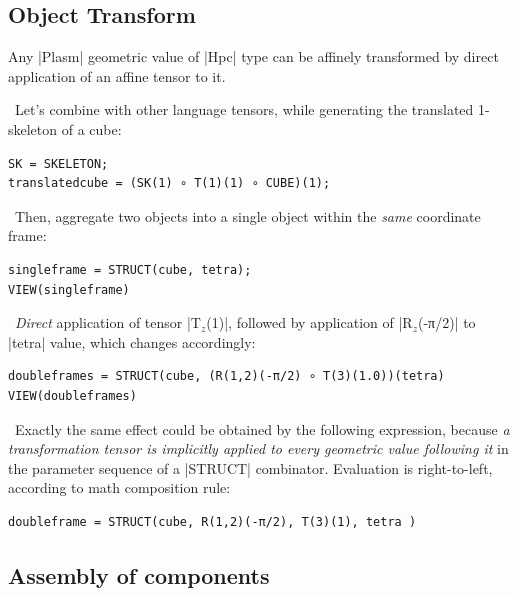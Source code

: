 \begin{coding}
\subsection*{Object Transform}\label{sect:4-3-1} Any |Plasm| geometric value of |Hpc| type can be affinely transformed by direct application of an affine tensor to it.

\begin{coding}\ 
Let’s combine with other language tensors, while generating the translated 1-skeleton of a cube:
\begin{lstlisting}[language=JuliaLocal, style=julia, mathescape=true]
SK = SKELETON;
translatedcube = (SK(1) ∘ T(1)(1) ∘ CUBE)(1);
\end{lstlisting}
\end{coding}

\begin{coding}[Example.2]\ 
Then, aggregate two objects into a single object within the \emph{same} coordinate frame:
\begin{lstlisting}[language=JuliaLocal, style=julia, mathescape=true]
singleframe = STRUCT(cube, tetra);
VIEW(singleframe)
\end{lstlisting}
\end{coding}

\begin{coding}[Example.3]\ 
\emph{Direct} application of tensor |T$_z$(1)|, followed by application of |R$_z$(-π/2)| to |tetra| value, which changes accordingly:
\begin{lstlisting}[language=JuliaLocal, style=julia, mathescape=true]
doubleframes = STRUCT(cube, (R(1,2)(-π/2) ∘ T(3)(1.0))(tetra) 
VIEW(doubleframes)
\end{lstlisting}
\end{coding}

\begin{coding}[Example.4]\ 
Exactly the same effect could be obtained by the following expression, because \emph{a transformation tensor is implicitly applied to every geometric value following it} in the parameter sequence of a |STRUCT| combinator. Evaluation is right-to-left, according to math composition rule:
\begin{lstlisting}[language=JuliaLocal, style=julia, mathescape=true]
doubleframe = STRUCT(cube, R(1,2)(-π/2), T(3)(1), tetra )
\end{lstlisting}
\end{coding}

\subsection*{Assembly of components}\label{sect:4-3-2}


\end{coding}
